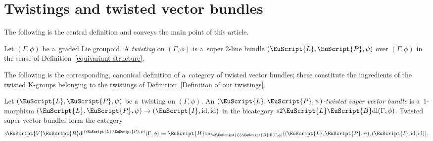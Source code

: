 \documentclass[10pt,a4paper]{amsart}
\numberwithin{equation}{section}
\def\mathscr#1{\EuScript{#1}}
\newcommand{\id}{\operatorname{id}}
\newcommand{\Hom}{\mathscr{H}\mathrm{om}}
\newcommand{\VectBdl}{\mathscr{V}\mathscr{B}\mathrm{dl}}
\newcommand{\LineBdl}{\mathscr{L}\mathscr{B}\mathrm{dl}}
\newcommand{\sVectBdl}{\mathrm{s}\VectBdl}
\newcommand{\stwoLineBdl}{\mathrm{s}2\LineBdl}
\begin{document}
\section{Twistings and twisted vector bundles}
\label{twistings}

The following is the central definition and conveys the main point of this article.

\begin{Definition} \label{Definition of our twistings}
Let $(\Gamma,\phi)$ be a~graded Lie groupoid. A \emph{twisting} on $(\Gamma,\phi)$ is a~super 2-line bundle $(\mathscr{L},\mathscr{P},\psi)$ over $(\Gamma,\phi)$ in the sense of Definition~\ref{equivariant structure}.
\end{Definition}

The following is the corresponding, canonical definition of a~category of twisted vector bundles; these constitute the ingredients of the twisted K-groups belonging to the twistings of Definition~\ref{Definition of our twistings}.

\begin{Definition}
\label{Definition of our twisted vector bundles}
Let $(\mathscr{L},\mathscr{P},\psi)$ be a~twisting on $(\Gamma,\phi)$. An \emph{$(\mathscr{L},\mathscr{P},\psi)$-twisted super vector bundle} is a~1-morphism $(\mathscr{L},\mathscr{P},\psi) \to (\mathscr{I},\id,\id)$ in the bicategory $\stwoLineBdl(\Gamma,\phi)$. Twisted super vector bundles form the category
\begin{equation*}
\sVectBdl^{(\mathscr{L},\mathscr{P},\psi)}(\Gamma,\phi) := \Hom_{\stwoLineBdl(\Gamma,\phi)}((\mathscr{L},\mathscr{P},\psi), (\mathscr{I},\id,\id)).
\end{equation*}
\end{Definition}
\end{document}
